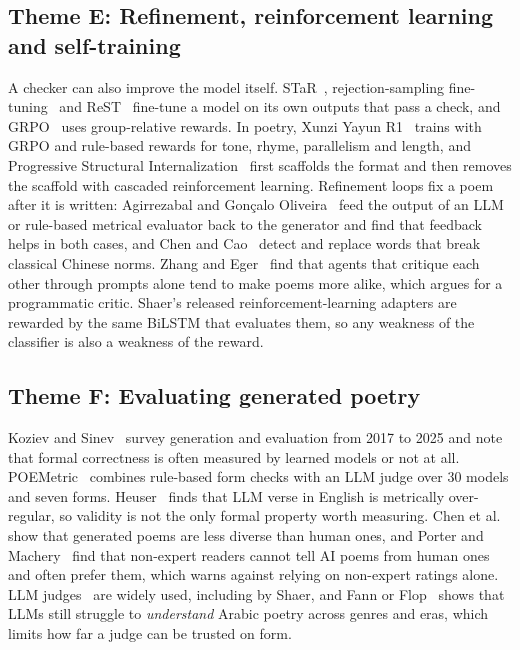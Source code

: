 \subsection{Theme E: Refinement, reinforcement learning and self-training}
A checker can also improve the model itself. STaR~\cite{zelikman2022star}, rejection-sampling fine-tuning~\cite{yuan2023rft}
and ReST~\cite{gulcehre2023rest} fine-tune a model on its own outputs that pass a check, and GRPO~\cite{shao2024deepseekmath}
uses group-relative rewards. In poetry, Xunzi Yayun R1~\cite{zhao2025xunziyayun} trains with GRPO and rule-based rewards
for tone, rhyme, parallelism and length, and Progressive Structural Internalization~\cite{li2026psi} first scaffolds the
format and then removes the scaffold with cascaded reinforcement learning. Refinement loops fix a poem after it is
written: Agirrezabal and Gon\c{c}alo Oliveira~\cite{agirrezabal2025refining} feed the output of an LLM or rule-based
metrical evaluator back to the generator and find that feedback helps in both cases, and Chen and
Cao~\cite{chen2024polishing} detect and replace words that break classical Chinese norms. Zhang and
Eger~\cite{zhang2026multiagent} find that agents that critique each other through prompts alone tend to make poems more
alike, which argues for a programmatic critic. Shaer's released reinforcement-learning adapters are rewarded by the
same BiLSTM that evaluates them, so any weakness of the classifier is also a weakness of the reward.

\subsection{Theme F: Evaluating generated poetry}
Koziev and Sinev~\cite{koziev2026survey} survey generation and evaluation from 2017 to 2025 and note that formal
correctness is often measured by learned models or not at all. POEMetric~\cite{wang2026poemetric} combines rule-based
form checks with an LLM judge over 30 models and seven forms. Heuser~\cite{heuser2025generative} finds that LLM verse in
English is metrically over-regular, so validity is not the only formal property worth measuring.
Chen et al.~\cite{chen2024diversity} show that generated poems are less diverse than human ones, and Porter and
Machery~\cite{porter2024aipoetry} find that non-expert readers cannot tell AI poems from human ones and often prefer
them, which warns against relying on non-expert ratings alone. LLM judges~\cite{zheng2023judge} are widely used,
including by Shaer, and Fann or Flop~\cite{alghallabi2025fann} shows that LLMs still struggle to \emph{understand}
Arabic poetry across genres and eras, which limits how far a judge can be trusted on form.

